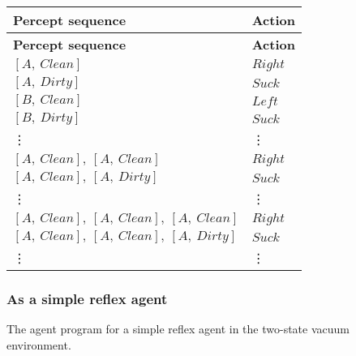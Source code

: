 \begin{customArrayStretch}{1.3}
\begin{longtable}{|l|l|}

\hline
\textbf{Percept sequence} & \textbf{Action} \\ \hline
\endhead

\hline
\textbf{Percept sequence} & \textbf{Action} \\ \hline
\endfirsthead

\hline\endfoot
\hline\endlastfoot


$[A, \ Clean]$ & $Right$ \\ 
$[A, \ Dirty]$ & $Suck$ \\ 
$[B, \ Clean]$ & $Left$ \\ 
$[B, \ Dirty]$ & $Suck$ \\ 

\vdots & \vdots \\

$[A, \ Clean],\ [A, \ Clean]$ & $Right$ \\ 
$[A, \ Clean],\ [A, \ Dirty]$ & $Suck$ \\ 

\vdots & \vdots \\

$[A, \ Clean],\ [A, \ Clean],\ [A, \ Clean]$ & $Right$ \\ 
$[A, \ Clean],\ [A, \ Clean],\ [A, \ Dirty]$ & $Suck$ \\ 

\vdots & \vdots \\

\end{longtable}
\end{customArrayStretch}





\subsubsection{As a simple reflex agent}

\begin{algorithm}[H]
    \caption{The agent program for a simple reflex agent in the two-state vacuum environment.  \cite{ai/book/Artificial-Intelligence-A-Modern-Approach/Russell-Norvig}}

\end{algorithm}







